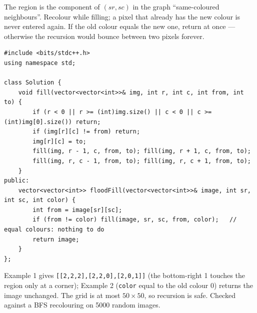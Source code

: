 \begin{solutionbox}
The region is the component of $(sr,sc)$ in the graph ``same-coloured neighbours''. Recolour while filling; a pixel that already has the new colour is never entered again. If the old colour equals the new one, return at once --- otherwise the recursion would bounce between two pixels forever.
\begin{lstlisting}[style=cpp]
#include <bits/stdc++.h>
using namespace std;

class Solution {
    void fill(vector<vector<int>>& img, int r, int c, int from, int to) {
        if (r < 0 || r >= (int)img.size() || c < 0 || c >= (int)img[0].size()) return;
        if (img[r][c] != from) return;
        img[r][c] = to;
        fill(img, r - 1, c, from, to); fill(img, r + 1, c, from, to);
        fill(img, r, c - 1, from, to); fill(img, r, c + 1, from, to);
    }
public:
    vector<vector<int>> floodFill(vector<vector<int>>& image, int sr, int sc, int color) {
        int from = image[sr][sc];
        if (from != color) fill(image, sr, sc, from, color);   // equal colours: nothing to do
        return image;
    }
};
\end{lstlisting}
Example 1 gives \texttt{[[2,2,2],[2,2,0],[2,0,1]]} (the bottom-right 1 touches the region only at a corner); Example 2 (\texttt{color} equal to the old colour 0) returns the image unchanged. The grid is at most $50\times50$, so recursion is safe. Checked against a BFS recolouring on 5000 random images.
\end{solutionbox}

